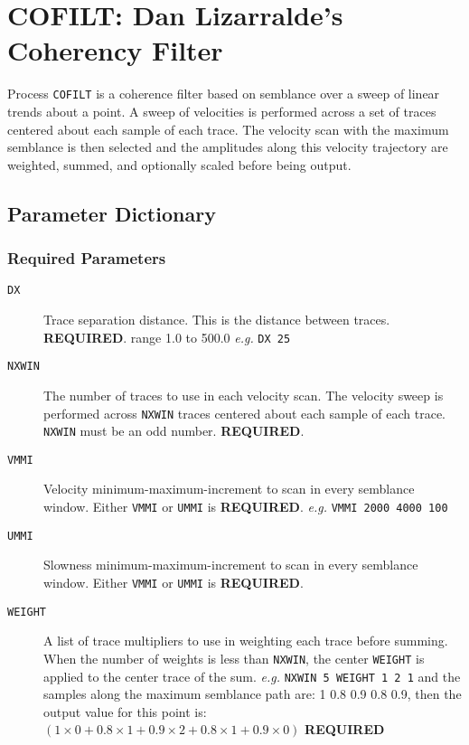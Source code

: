 \section{COFILT: Dan Lizarralde's Coherency Filter}
\label{cmd_cofilt}

Process \texttt{COFILT} is a coherence filter based on semblance over a sweep of
linear trends about a point.  A sweep of velocities is performed across
a set of traces centered about each sample of each trace.  The velocity
scan with the maximum semblance is then selected and the amplitudes
along this velocity trajectory are weighted, summed, and optionally
scaled before being output.

\subsection{Parameter Dictionary}

\subsubsection{Required Parameters}
\begin{description}
\item[\texttt{DX}] Trace separation distance.  This is the distance between traces.  \textbf{REQUIRED}.  range 1.0 to 500.0 \textit{e.g.}  \texttt{DX 25}
\item[\texttt{NXWIN}] The number of traces to use in each velocity scan.  The velocity sweep is performed across \texttt{NXWIN} traces centered about each sample of each trace.  \texttt{NXWIN} must be an odd number.  \textbf{REQUIRED}.
\item[\texttt{VMMI}] Velocity minimum-maximum-increment to scan in every semblance window.  Either \texttt{VMMI} or \texttt{UMMI} is \textbf{REQUIRED}.  \textit{e.g.} \texttt{VMMI 2000 4000 100}
\item[\texttt{UMMI}] Slowness minimum-maximum-increment to scan in every semblance window.  Either \texttt{VMMI} or \texttt{UMMI} is \textbf{REQUIRED}.
\item[\texttt{WEIGHT}] A list of trace multipliers to use in weighting each trace before summing.  When the number of weights is less than \texttt{NXWIN}, the center \texttt{WEIGHT} is applied to the center trace of the sum.  \textit{e.g.}  \texttt{NXWIN 5 WEIGHT 1 2 1} and the samples along the maximum semblance path are: 1 0.8 0.9 0.8 0.9, then the output value for this point is: $(1 \times 0 + 0.8 \times 1 + 0.9 \times 2 + 0.8 \times 1 + 0.9 \times 0)$ \textbf{REQUIRED}
\end{description}

